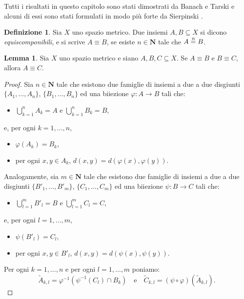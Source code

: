 \documentclass[a4paper,oneside,11pt]{book}
\theoremstyle{definition} \newtheorem{Def}{Definizione}
\theoremstyle{plain} \newtheorem{teo}{Teorema}
\theoremstyle{plain} \newtheorem{cor}[teo]{Corollario}
\theoremstyle{definition} \newtheorem{lem}[teo]{Lemma}
\theoremstyle{plain} \newtheorem{pro}[teo]{Proposizione}
\newcommand{\eqf}{\equiv}
\newcommand{\eqn}[1]{\stackrel{\text{\textit{#1}}}{=}}
\begin{document}
	Tutti i risultati in questo capitolo sono stati dimostrati da Banach e Tarski \cite{bantar} e alcuni di essi sono stati formulati in modo più forte da Sierpinski \cite{sierp}.

	\begin{Def}
		Sia $X$ uno spazio metrico. Due insiemi $A, B \subseteq X$ si dicono \emph{equiscomponibili}, e si scrive $A \eqf B$, se esiste $n \in \mathbf{N}$ tale che $A \eqn{n} B$.
	\end{Def}

	\begin{lem}\label{eqftra} %
		Sia $X$ uno spazio metrico e siano $A, B, C \subseteq X$. Se $A \eqf B$ e $B \eqf C$, allora $A \eqf C$.
	\end{lem}
	
	\begin{proof}
		Sia $n \in \mathbf{N}$ tale che esistono due famiglie di insiemi a due a due disgiunti $\{A_1, \dots, A_n\}$,  $\{B_1, \dots, B_n\}$ ed una biiezione $\varphi: A \to B$ tali che:
		\begin{itemize}
			\item $\bigcup\limits_{k=1}^n A_k = A$ e $\bigcup\limits_{k=1}^n B_k = B$,
		\end{itemize}
		e, per ogni $k = 1, \dots, n$,
		\begin{itemize}
			\item $\varphi(A_k) = B_k$,
			\item per ogni $x,y \in A_k$, $d(x, y) = d(\varphi(x), \varphi(y))$.
		\end{itemize}
	
		Analogamente, sia $m \in \mathbf{N}$ tale che esistono due famiglie di insiemi a due a due disgiunti $\{B'_1, \dots, B'_m\}$, $\{C_1, \dots, C_m\}$ ed una biiezione $\psi: B \to C$ tali che:
		\begin{itemize}
			\item $\bigcup\limits_{l=1}^m B'_l = B$ e $\bigcup\limits_{l=1}^m C_l = C$,
		\end{itemize}
		e, per ogni $l = 1, \dots, m$,
		\begin{itemize}
			\item $\psi(B'_l) = C_l$,
			\item per ogni $x,y \in B'_l$, $d(x, y) = d(\psi(x), \psi(y))$.
		\end{itemize}
	
		Per ogni $k = 1, \dots, n$ e per ogni $l = 1, \dots, m$ poniamo:
		\begin{equation*}
			\tilde{A}_{k,l} = \varphi^{-1}(\psi^{-1}(C_l) \cap B_k) \quad \text{e} \quad \tilde{C}_{k,l} = (\psi \circ \varphi)(\tilde{A}_{k,l}) \text{.}
		\end{equation*}
	

\end{proof}
\end{document}
